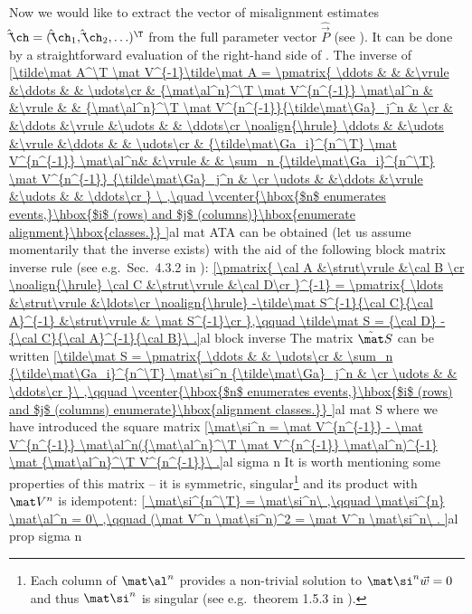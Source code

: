Now we would like to extract the vector of misalignment estimates $\hat\vec\ch = (\hat\vec\ch_1, \hat\vec\ch_2, \ldots)^\T$ from the full parameter vector $\hat\vec P$ (see ). It can be done by a straightforward evaluation of the right-hand side of . The inverse of
\eqref{\tilde\mat A^\T \mat V^{-1}\tilde\mat A =
\pmatrix{
\ddots 	& 											& 		&\vrule &\ddots & 														& \udots\cr
	 	& {\mat\al^n}^\T \mat V^{n^{-1}} \mat\al^n	& 		&\vrule & 		& {\mat\al^n}^\T \mat V^{n^{-1}}{\tilde\mat\Ga}_j^n 			& 		\cr
 		& 											&\ddots &\vrule &\udots & 														& \ddots\cr
\noalign{\hrule}
\ddots 	& 											&\udots	&\vrule &\ddots & 														& \udots\cr
	 	& {\tilde\mat\Ga_i}^{n^\T} \mat V^{n^{-1}} \mat\al^n& 		&\vrule & 		& \sum_n {\tilde\mat\Ga_i}^{n^\T} \mat V^{n^{-1}} {\tilde\mat\Ga}_j^n 	& \cr
\udots	& 											&\ddots &\vrule &\udots & 														& \ddots\cr
}
\ ,\quad 
\vcenter{\hbox{$n$ enumerates events,}\hbox{$i$ (rows) and $j$ (columns)}\hbox{enumerate alignment}\hbox{classes.}}
}{al mat ATA}
can be obtained (let us assume momentarily that the inverse exists) with the aid of the following block matrix inverse rule (see e.g.~Sec.~4.3.2 in ):
\eqref{\pmatrix{
	\cal A	&\strut\vrule	&\cal B	\cr
	\noalign{\hrule}
	\cal C	&\strut\vrule	&\cal D\cr
	}^{-1} = \pmatrix{
	\ldots							&\strut\vrule	&\ldots\cr
	\noalign{\hrule}
	-\tilde\mat S^{-1}{\cal C}{\cal A}^{-1}	&\strut\vrule	& \mat S^{-1}\cr
},\qquad \tilde\mat S = {\cal D} - {\cal C}{\cal A}^{-1}{\cal B}\ .}{al block inverse}
The matrix $\tilde\mat S$ can be written
\eqref{\tilde\mat S = \pmatrix{
	\ddots	& 																		& \udots\cr
			& \sum_n {\tilde\mat\Ga_i}^{n^\T} \mat\si^n {\tilde\mat\Ga}_j^n 	& \cr
	\udots	& 																		& \ddots\cr
}\ ,\qquad
\vcenter{\hbox{$n$ enumerates events,}\hbox{$i$ (rows) and $j$ (columns) enumerate}\hbox{alignment classes.}}
}{al mat S}
where we have introduced the square matrix
\eqref{\mat\si^n = \mat V^{n^{-1}} - \mat V^{n^{-1}} \mat\al^n({\mat\al^n}^\T \mat V^{n^{-1}} \mat\al^n)^{-1} \mat {\mat\al^n}^\T V^{n^{-1}}\ .}{al sigma n}
It is worth mentioning some properties of this matrix -- it is symmetric, singular\footnote{%
Each column of $\mat\al^n$ provides a non-trivial solution to $\mat\si^{n} \vec w = 0$ and thus $\mat\si^n$ is singular (see e.g.~theorem 1.5.3 in ).} and its product with $\mat V^n$ is idempotent:
\eqref{
	\mat\si^{n^\T} = \mat\si^n\ ,\qquad
	\mat\si^{n} \mat\al^n = 0\ ,\qquad
	(\mat V^n \mat\si^n)^2 = \mat V^n \mat\si^n\ .
}{al prop sigma n}

